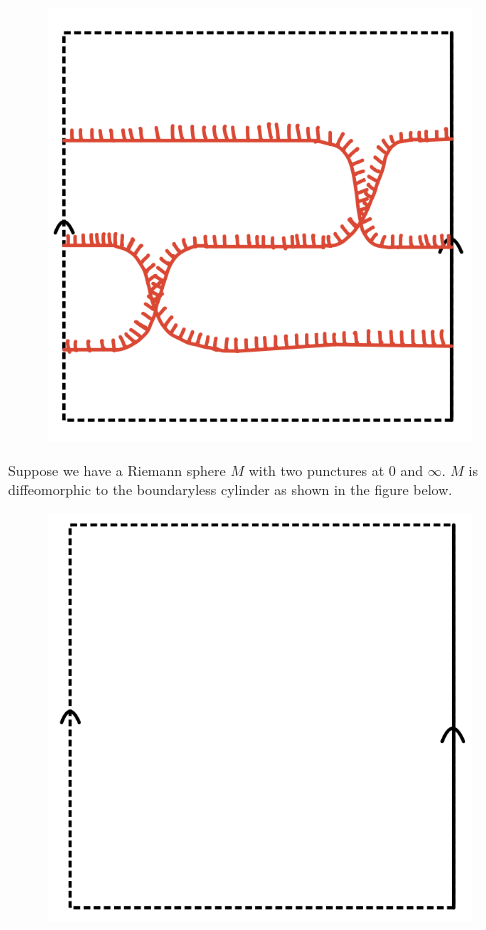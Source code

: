 \begin{figure}[H] 
    \centering
    \includegraphics[scale = 0.55]{diagrams/natural_alternating_diagrams/2.png} 
    \caption{}
    \label{fig:your-label}
\end{figure}

Suppose we have a Riemann sphere $M$ with two punctures at $0$ and $\infty$. $M$ is diffeomorphic to the boundaryless cylinder as shown in the figure below.

\begin{figure}[H]
    \centering
    \includegraphics[scale = 0.55]{diagrams/natural_alternating_diagrams/3.png} 
    \caption{}
    \label{fig:your-label}
\end{figure}

